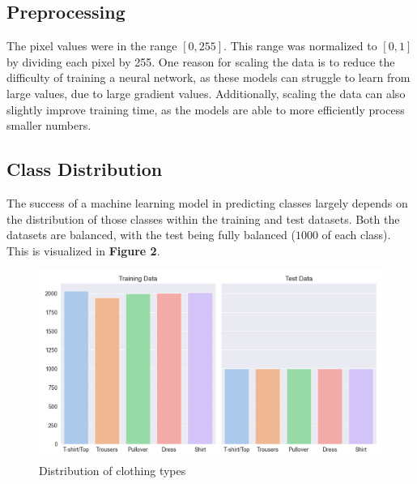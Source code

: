 \subsection{Preprocessing}\label{subsec:preprocessing}
The pixel values were in the range $[0, 255]$.
This range was normalized to $[0, 1]$ by dividing each pixel by 255.
One reason for scaling the data is to reduce the difficulty of training a neural network, as these models can struggle to learn from large values, due to large gradient values.
Additionally, scaling the data can also slightly improve training time, as the models are able to more efficiently process smaller numbers.
\subsection{Class Distribution}\label{subsec:class-distribution}
The success of a machine learning model in predicting classes largely depends on the distribution of those classes within the training and test datasets.
Both the datasets are balanced, with the test being fully balanced ($1000$ of each class).
This is visualized in \textbf{Figure 2}.
\begin{figure}[ht]
\centering
\includegraphics[scale=0.45]{figures_for_report/class_distribution}
\captionsetup{justification=centering,margin=2cm}
\caption{Distribution of clothing types}\label{fig:figure2}
\end{figure}

